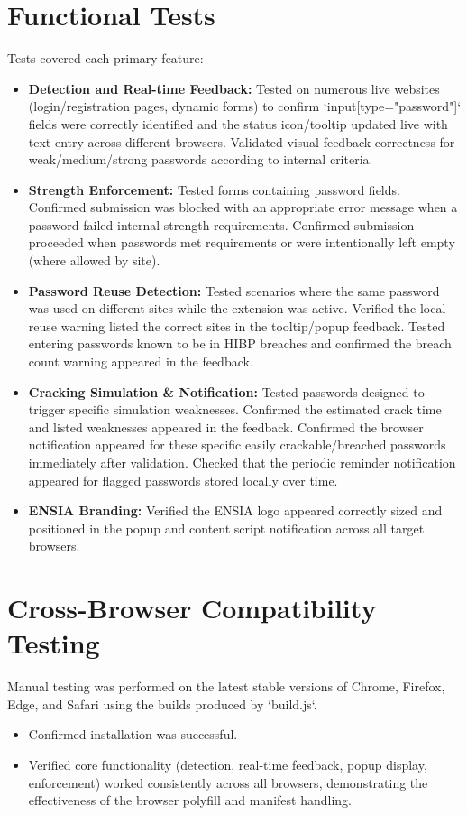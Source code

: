 \documentclass[11pt,oneside,a4paper]{book}
\begin{document}
\section{Functional Tests}
Tests covered each primary feature:
\begin{itemize}
    \item \textbf{Detection and Real-time Feedback:} Tested on numerous live websites (login/registration pages, dynamic forms) to confirm `input[type="password"]` fields were correctly identified and the status icon/tooltip updated live with text entry across different browsers. Validated visual feedback correctness for weak/medium/strong passwords according to internal criteria.
    \item \textbf{Strength Enforcement:} Tested forms containing password fields. Confirmed submission was blocked with an appropriate error message when a password failed internal strength requirements. Confirmed submission proceeded when passwords met requirements or were intentionally left empty (where allowed by site).
    \item \textbf{Password Reuse Detection:} Tested scenarios where the same password was used on different sites while the extension was active. Verified the local reuse warning listed the correct sites in the tooltip/popup feedback. Tested entering passwords known to be in HIBP breaches and confirmed the breach count warning appeared in the feedback.
    \item \textbf{Cracking Simulation & Notification:} Tested passwords designed to trigger specific simulation weaknesses. Confirmed the estimated crack time and listed weaknesses appeared in the feedback. Confirmed the browser notification appeared for these specific easily crackable/breached passwords immediately after validation. Checked that the periodic reminder notification appeared for flagged passwords stored locally over time.
    \item \textbf{ENSIA Branding:} Verified the ENSIA logo appeared correctly sized and positioned in the popup and content script notification across all target browsers.
\end{itemize}

\section{Cross-Browser Compatibility Testing}
Manual testing was performed on the latest stable versions of Chrome, Firefox, Edge, and Safari using the builds produced by `build.js`.
\begin{itemize}
    \item Confirmed installation was successful.
    \item Verified core functionality (detection, real-time feedback, popup display, enforcement) worked consistently across all browsers, demonstrating the effectiveness of the browser polyfill and manifest handling.
\end{itemize}
\end{document}
